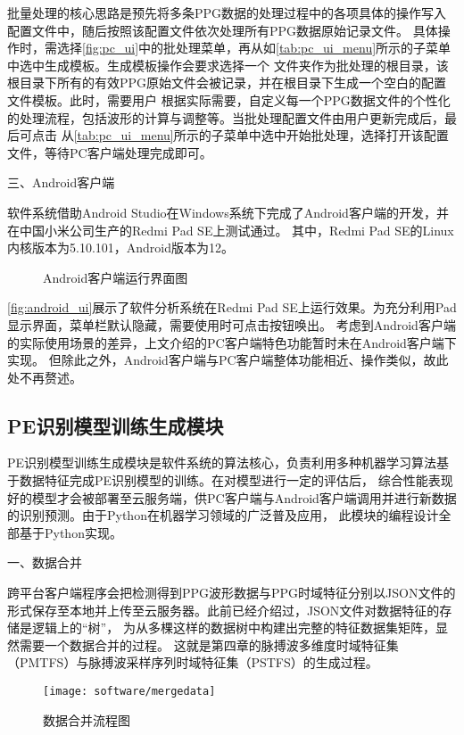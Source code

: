 批量处理的核心思路是预先将多条PPG数据的处理过程中的各项具体的操作写入配置文件中，随后按照该配置文件依次处理所有PPG数据原始记录文件。
具体操作时，需选择\autoref{fig:pc_ui}中的批处理菜单，再从如\autoref{tab:pc_ui_menu}所示的子菜单中选中生成模板。生成模板操作会要求选择一个
文件夹作为批处理的根目录，该根目录下所有的有效PPG原始文件会被记录，并在根目录下生成一个空白的配置文件模板。此时，需要用户
根据实际需要，自定义每一个PPG数据文件的个性化的处理流程，包括波形的计算与调整等。当批处理配置文件由用户更新完成后，最后可点击
从\autoref{tab:pc_ui_menu}所示的子菜单中选中开始批处理，选择打开该配置文件，等待PC客户端处理完成即可。

三、Android客户端

软件系统借助Android Studio在Windows系统下完成了Android客户端的开发，并在中国小米公司生产的Redmi Pad SE上测试通过。
其中，Redmi Pad SE的Linux内核版本为5.10.101，Android版本为12。
\begin{figure}[htbp]
    \centering
    \quad
    \caption{\label{fig:android_ui}Android客户端运行界面图}
\end{figure}

\autoref{fig:android_ui}展示了软件分析系统在Redmi Pad SE上运行效果。为充分利用Pad显示界面，菜单栏默认隐藏，需要使用时可点击按钮唤出。
考虑到Android客户端的实际使用场景的差异，上文介绍的PC客户端特色功能暂时未在Android客户端下实现。
但除此之外，Android客户端与PC客户端整体功能相近、操作类似，故此处不再赘述。

\subsection{PE识别模型训练生成模块}
PE识别模型训练生成模块是软件系统的算法核心，负责利用多种机器学习算法基于数据特征完成PE识别模型的训练。在对模型进行一定的评估后，
综合性能表现好的模型才会被部署至云服务端，供PC客户端与Android客户端调用并进行新数据的识别预测。由于Python在机器学习领域的广泛普及应用，
此模块的编程设计全部基于Python实现。

一、数据合并

跨平台客户端程序会把检测得到PPG波形数据与PPG时域特征分别以JSON文件的形式保存至本地并上传至云服务器。此前已经介绍过，JSON文件对数据特征的存储是逻辑上的“树”，
为从多棵这样的数据树中构建出完整的特征数据集矩阵，显然需要一个数据合并的过程。
这就是第四章的脉搏波多维度时域特征集（PMTFS）与脉搏波采样序列时域特征集（PSTFS）的生成过程。
\begin{figure}[htbp]
    \centering
    \texttt{[image: software/mergedata]}
    \caption{\label{fig:mergedata}数据合并流程图}
\end{figure}


